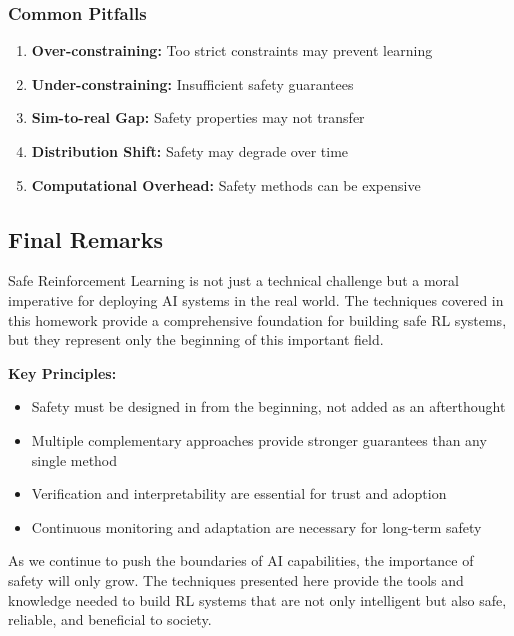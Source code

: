 \documentclass[12pt]{article}
\begin{document}
{{{{\subsubsection{Common Pitfalls}

\begin{enumerate}
\item \textbf{Over-constraining:} Too strict constraints may prevent learning
\item \textbf{Under-constraining:} Insufficient safety guarantees
\item \textbf{Sim-to-real Gap:} Safety properties may not transfer
\item \textbf{Distribution Shift:} Safety may degrade over time
\item \textbf{Computational Overhead:} Safety methods can be expensive
\end{enumerate}

\subsection{Final Remarks}

Safe Reinforcement Learning is not just a technical challenge but a moral imperative for deploying AI systems in the real world. The techniques covered in this homework provide a comprehensive foundation for building safe RL systems, but they represent only the beginning of this important field.

\textbf{Key Principles:}
\begin{itemize}
\item Safety must be designed in from the beginning, not added as an afterthought
\item Multiple complementary approaches provide stronger guarantees than any single method
\item Verification and interpretability are essential for trust and adoption
\item Continuous monitoring and adaptation are necessary for long-term safety
\end{itemize}

As we continue to push the boundaries of AI capabilities, the importance of safety will only grow. The techniques presented here provide the tools and knowledge needed to build RL systems that are not only intelligent but also safe, reliable, and beneficial to society.




\newpage

}}}}
\end{document}
